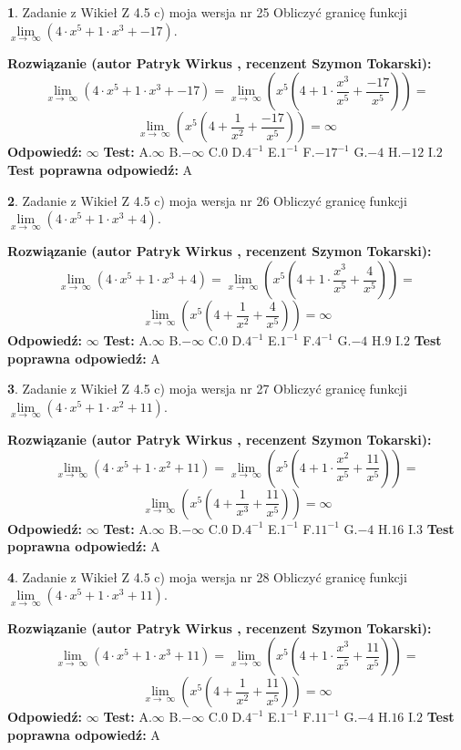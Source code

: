 \documentclass[12pt, a4paper]{article}
\theoremstyle{definition} %
\newtheorem{zad}{}
\newcommand{\zadStart}[1]{\begin{zad}#1\newline}
\newcommand{\zadStop}{\end{zad}}
\newcommand{\rozwStart}[2]{\noindent \textbf{Rozwiązanie (autor #1 , recenzent #2): }\newline}
\newcommand{\rozwStop}{\newline}
\newcommand{\odpStart}{\noindent \textbf{Odpowiedź:}\newline}
\newcommand{\odpStop}{\newline}
\newcommand{\testStart}{\noindent \textbf{Test:}\newline}
\newcommand{\testStop}{\newline}
\newcommand{\kluczStart}{\noindent \textbf{Test poprawna odpowiedź:}\newline}
\newcommand{\kluczStop}{\newline}
\begin{document}
\zadStart{Zadanie z Wikieł Z 4.5 c) moja wersja nr 25}
Obliczyć granicę funkcji  $\lim\limits_{x\to\ \infty}(4 \cdot x^{5}+1 \cdot x^{3}+-17)$.
\zadStop
\rozwStart{Patryk Wirkus}{Szymon Tokarski}
$$\lim\limits_{x\to\ \infty}(4 \cdot x^{5}+1 \cdot x^{3}+-17) = \lim\limits_{x\to\ \infty}(x^{5}(4 +1 \cdot \frac{x^{3}}{x^{5}}+\frac{-17}{x^{5}})) =$$ $$\lim\limits_{x\to\ \infty}(x^{5}(4 +\frac{1}{x^{2}}+\frac{-17}{x^{5}})) =\infty$$
\rozwStop
\odpStart
$\infty$
\odpStop
\testStart
A.$\infty$ B.$-\infty$ C.$0$ D.$4^{-1}$ E.$1^{-1}$
F.$-17^{-1}$ G.$-4$
H.$-12$
I.$2$
\testStop
\kluczStart
A
\kluczStop



\zadStart{Zadanie z Wikieł Z 4.5 c) moja wersja nr 26}
Obliczyć granicę funkcji  $\lim\limits_{x\to\ \infty}(4 \cdot x^{5}+1 \cdot x^{3}+4)$.
\zadStop
\rozwStart{Patryk Wirkus}{Szymon Tokarski}
$$\lim\limits_{x\to\ \infty}(4 \cdot x^{5}+1 \cdot x^{3}+4) = \lim\limits_{x\to\ \infty}(x^{5}(4 +1 \cdot \frac{x^{3}}{x^{5}}+\frac{4}{x^{5}})) =$$ $$\lim\limits_{x\to\ \infty}(x^{5}(4 +\frac{1}{x^{2}}+\frac{4}{x^{5}})) =\infty$$
\rozwStop
\odpStart
$\infty$
\odpStop
\testStart
A.$\infty$ B.$-\infty$ C.$0$ D.$4^{-1}$ E.$1^{-1}$
F.$4^{-1}$ G.$-4$
H.$9$
I.$2$
\testStop
\kluczStart
A
\kluczStop



\zadStart{Zadanie z Wikieł Z 4.5 c) moja wersja nr 27}
Obliczyć granicę funkcji  $\lim\limits_{x\to\ \infty}(4 \cdot x^{5}+1 \cdot x^{2}+11)$.
\zadStop
\rozwStart{Patryk Wirkus}{Szymon Tokarski}
$$\lim\limits_{x\to\ \infty}(4 \cdot x^{5}+1 \cdot x^{2}+11) = \lim\limits_{x\to\ \infty}(x^{5}(4 +1 \cdot \frac{x^{2}}{x^{5}}+\frac{11}{x^{5}})) =$$ $$\lim\limits_{x\to\ \infty}(x^{5}(4 +\frac{1}{x^{3}}+\frac{11}{x^{5}})) =\infty$$
\rozwStop
\odpStart
$\infty$
\odpStop
\testStart
A.$\infty$ B.$-\infty$ C.$0$ D.$4^{-1}$ E.$1^{-1}$
F.$11^{-1}$ G.$-4$
H.$16$
I.$3$
\testStop
\kluczStart
A
\kluczStop



\zadStart{Zadanie z Wikieł Z 4.5 c) moja wersja nr 28}
Obliczyć granicę funkcji  $\lim\limits_{x\to\ \infty}(4 \cdot x^{5}+1 \cdot x^{3}+11)$.
\zadStop
\rozwStart{Patryk Wirkus}{Szymon Tokarski}
$$\lim\limits_{x\to\ \infty}(4 \cdot x^{5}+1 \cdot x^{3}+11) = \lim\limits_{x\to\ \infty}(x^{5}(4 +1 \cdot \frac{x^{3}}{x^{5}}+\frac{11}{x^{5}})) =$$ $$\lim\limits_{x\to\ \infty}(x^{5}(4 +\frac{1}{x^{2}}+\frac{11}{x^{5}})) =\infty$$
\rozwStop
\odpStart
$\infty$
\odpStop
\testStart
A.$\infty$ B.$-\infty$ C.$0$ D.$4^{-1}$ E.$1^{-1}$
F.$11^{-1}$ G.$-4$
H.$16$
I.$2$
\testStop
\kluczStart
A
\kluczStop
\end{document}
